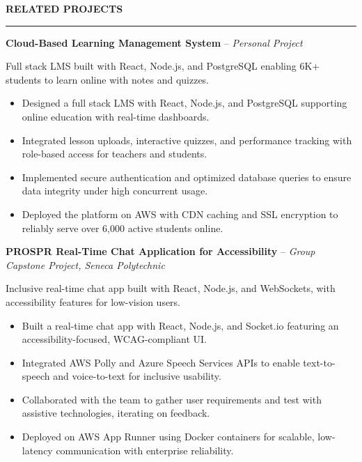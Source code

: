 \documentclass[10pt,letterpaper]{article}
\begin{document}
\vspace{6pt}

\textbf{RELATED PROJECTS}\\[-8pt]
\noindent\rule{\textwidth}{1pt}

\vspace{-2pt}

\textbf{Cloud-Based Learning Management System} -- \emph{Personal Project}

\vspace{-1pt}

Full stack LMS built with React, Node.js, and PostgreSQL enabling 6K+ students to learn online with notes and quizzes.
\vspace{-1pt}
\begin{itemize}
\item Designed a full stack LMS with React, Node.js, and PostgreSQL supporting online education with real-time dashboards.
\item Integrated lesson uploads, interactive quizzes, and performance tracking with role-based access for teachers and students.
\item Implemented secure authentication and optimized database queries to ensure data integrity under high concurrent usage.
\item Deployed the platform on AWS with CDN caching and SSL encryption to reliably serve over 6,000 active students online.
\end{itemize}

\textbf{PROSPR Real-Time Chat Application for Accessibility} -- \emph{Group Capstone Project, Seneca Polytechnic}

\vspace{-1pt}

Inclusive real-time chat app built with React, Node.js, and WebSockets, with accessibility features for low-vision users.
\vspace{-1pt}
\begin{itemize}
\item Built a real-time chat app with React, Node.js, and Socket.io featuring an accessibility-focused, WCAG-compliant UI.
\item Integrated AWS Polly and Azure Speech Services APIs to enable text-to-speech and voice-to-text for inclusive usability.
\item Collaborated with the team to gather user requirements and test with assistive technologies, iterating on feedback.
\item Deployed on AWS App Runner using Docker containers for scalable, low-latency communication with enterprise reliability.
\end{itemize}
\end{document}
